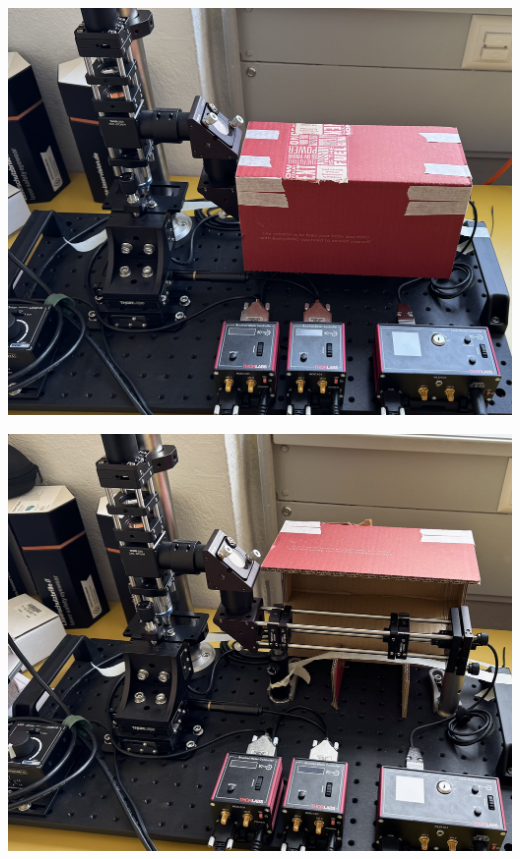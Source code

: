 \begin{minipage}[c]{0.48\textwidth}
    \begin{center}
        \includegraphics[width=\textwidth]{assets/figures/Protections_laser/Securite_mecanique/Protection_entree_laser/carton_protection_ferme.jpeg}
    \end{center}
    \label{carton_protection_fermee}
\end{minipage}\hfill
\begin{minipage}[c]{0.48\textwidth}
    \begin{center}
        \includegraphics[width=\textwidth]{assets/figures/Protections_laser/Securite_mecanique/Protection_entree_laser/carton_protection_ouvert.jpeg}
    \end{center}
    \label{carton_protection_ouverte}
\end{minipage}

